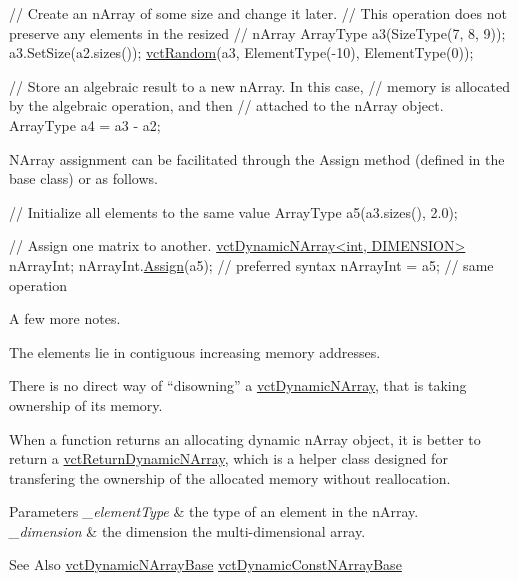 \begin{DoxyEnumerate}
\begin{DoxyCode}
\textcolor{comment}{// Create an nArray of some size and change it later.}
\textcolor{comment}{// This operation does not preserve any elements in the resized}
\textcolor{comment}{// nArray}
ArrayType a3(SizeType(7, 8, 9));
a3.SetSize(a2.sizes());
\hyperlink{group__cisst_vector_ga0d25660a2dc6ef9c093f6f6b2804d2d0}{vctRandom}(a3, ElementType(-10), ElementType(0));

\textcolor{comment}{// Store an algebraic result to a new nArray.  In this case,}
\textcolor{comment}{// memory is allocated by the algebraic operation, and then}
\textcolor{comment}{// attached to the nArray object.}
ArrayType a4 = a3 - a2;
\end{DoxyCode}
 
\item N\-Array assignment can be facilitated through the Assign method (defined in the base class) or as follows. 
\begin{DoxyCode}
\textcolor{comment}{// Initialize all elements to the same value}
ArrayType a5(a3.sizes(), 2.0);

\textcolor{comment}{// Assign one matrix to another.}
\hyperlink{classvct_dynamic_n_array}{vctDynamicNArray<int, DIMENSION>} nArrayInt;
nArrayInt.\hyperlink{classvct_dynamic_n_array_base_ab9c91c7f9a6c59ba68d3467c26853215}{Assign}(a5); \textcolor{comment}{// preferred syntax}
nArrayInt = a5; \textcolor{comment}{// same operation}
\end{DoxyCode}
 
\end{DoxyEnumerate}

A few more notes. 
\begin{DoxyItemize}
\item The elements lie in contiguous increasing memory addresses. 
\item There is no direct way of ``disowning'' a \hyperlink{classvct_dynamic_n_array}{vct\-Dynamic\-N\-Array}, that is taking ownership of its memory. 
\item When a function returns an allocating dynamic n\-Array object, it is better to return a \hyperlink{classvct_return_dynamic_n_array}{vct\-Return\-Dynamic\-N\-Array}, which is a helper class designed for transfering the ownership of the allocated memory without reallocation. 
\end{DoxyItemize}


\begin{DoxyParams}{Parameters}
{\em \-\_\-element\-Type} & the type of an element in the n\-Array.\\
\hline
{\em \-\_\-dimension} & the dimension the multi-\/dimensional array.\\
\hline
\end{DoxyParams}
\begin{DoxySeeAlso}{See Also}
\hyperlink{classvct_dynamic_n_array_base}{vct\-Dynamic\-N\-Array\-Base} \hyperlink{classvct_dynamic_const_n_array_base}{vct\-Dynamic\-Const\-N\-Array\-Base} 
\end{DoxySeeAlso}


